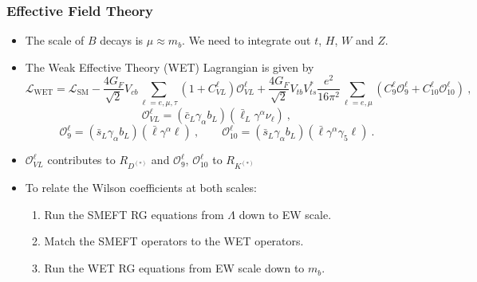 \documentclass[mathserif, 10pt]{beamer}
\begin{document}
\begin{frame}\frametitle{Effective Field Theory}
\begin{itemize}

\item The scale of $B$ decays is $\mu \approx m_b$. We need to integrate out $t$, $H$, $W$ and $Z$.

\item The Weak Effective Theory (WET) Lagrangian is given by
{\scriptsize $$\mathcal{L}_{\text{WET}} = \mathcal{L}_\mathrm{SM} -\frac{4 G_F}{\sqrt{2}}V_{cb}\sum_{\ell = e, \mu, \tau} (1 + C_{VL}^\ell) \mathcal{O}_{VL}^\ell + \frac{4G_F}{\sqrt{2}}V_{tb}V_{ts}^*\frac{e^2}{16\pi^2}\sum_{\ell=e,\mu} (C_9^\ell \mathcal{O}_9^\ell  + C_{10}^\ell \mathcal{O}_{10}^\ell) \ ,$$}
{ $$\mathcal{O}_{VL}^\ell = (\bar{c}_L \gamma_\alpha b_L)(\bar{\ell}_L \gamma^\alpha \nu_\ell)\ ,$$ $$\mathcal{O}_9^\ell = (\bar{s}_L \gamma_\alpha b_L)(\bar{\ell} \gamma^\alpha \ell)\ , \qquad \mathcal{O}_{10}^\ell = (\bar{s}_L \gamma_\alpha b_L)(\bar{\ell} \gamma^\alpha \gamma_5 \ell) \ .$$}

\item $\mathcal{O}_{VL}^\ell$ contributes to $R_{D^{(*)}}$ and $\mathcal{O}_9^\ell$, $\mathcal{O}_{10}^\ell$ to $R_{K^{(*)}}$

\item To relate the Wilson coefficients at both scales:
\begin{enumerate}
    \item Run the SMEFT RG equations from $\Lambda$ down to EW scale.
    \item Match the SMEFT operators to the WET operators.
    \item Run the WET RG equations from EW scale down to $m_b$.
\end{enumerate}
    
\end{itemize}
\end{frame}
\end{document}
